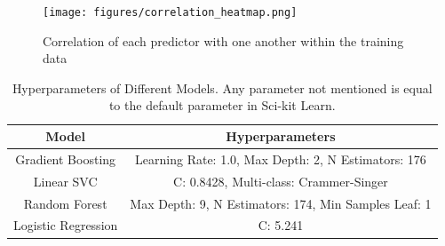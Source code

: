 \documentclass{IEEEtran}
\begin{document}
\begin{figure}
  \centering
  \texttt{[image: figures/correlation\_heatmap.png]}
  \caption{Correlation of each predictor with one another within the training data}
  \label{fig:correlation}
\end{figure}


\begin{table}[h!]
  \centering
  \begin{tabular}{|c|c|}
      \hline
      \textbf{Model} & \textbf{Hyperparameters} \\
      \hline
      Gradient Boosting & Learning Rate: 1.0, Max Depth: 2, N Estimators: 176 \\
      \hline
      Linear SVC & C: 0.8428, Multi-class: Crammer-Singer \\
      \hline
      Random Forest & Max Depth: 9, N Estimators: 174, Min Samples Leaf: 1 \\
      \hline
      Logistic Regression & C: 5.241 \\
      \hline
  \end{tabular}
  \caption{Hyperparameters of Different Models. Any parameter not mentioned is equal to the default parameter in Sci-kit Learn.}
  \label{tab:hyperparameters}
\end{table}
\end{document}
